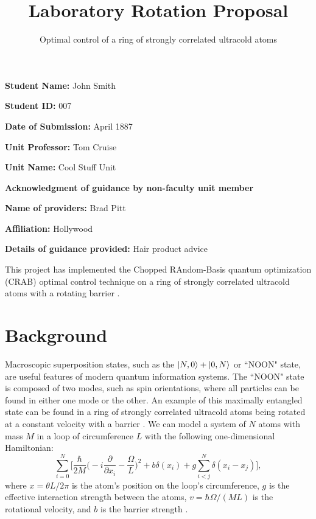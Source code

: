 \documentclass[paper=a4wide, fontsize=12pt]{scrartcl}	 %
\title{\vspace{-1.8cm}  \color{DarkRed} Laboratory Rotation Proposal}
\subtitle{Optimal control of a ring of strongly correlated ultracold atoms %
\vspace{-2cm} }
\date{} %
\begin{document}
\maketitle %
\thispagestyle{fancy} %


\vspace{-0.5cm} \textbf{Student Name:}  John Smith

\textbf{Student ID:} 007

\textbf{Date of Submission:} April 1887

 \textbf{Unit Professor:} Tom Cruise

\textbf{Unit Name:} Cool Stuff Unit

\vspace{3mm} \textbf{Acknowledgment of guidance by non-faculty unit member} 

\textbf{Name of providers:} Brad Pitt

\textbf{Affiliation:} Hollywood

\textbf{Details of guidance provided:}	 Hair product advice

\vspace{0.5cm}


This project has implemented the Chopped RAndom-Basis quantum optimization (CRAB) optimal control technique \cite{CRAB} on a ring of strongly correlated ultracold atoms with a rotating barrier \cite{RING}.


\section*{Background}
Macroscopic superposition states, such as the $\ket{N,0} + \ket{0,N}$ or ``NOON" state, are useful features of modern quantum information systems. The ``NOON" state is composed of two modes, such as spin orientations, where all particles can be found in either one mode or the other. An example of this maximally entangled state can be found in a ring of strongly correlated ultracold atoms being rotated at a constant velocity with a barrier \cite{RING}. We can model a system of $N$ atoms with mass $M$ in a loop of circumference $L$ with the following one-dimensional Hamiltonian\cite{RING}:
$$\sum_{i=0} ^{N} \bigg[{\frac{\hbar}{2M}\bigg(-i\frac{\partial}{\partial x_i}-\frac{\Omega}{L}}\bigg)^2 + b\delta(x_i) +g \sum_{i<j} ^{N} \delta (x_i - x_j )\bigg],$$
where $x = \theta L / 2 \pi$ is the atom's position on the loop's circumference, $g$ is the effective interaction strength between the atoms, $v = \hbar \Omega/(ML)$ is the rotational velocity, and $b$ is the barrier strength \cite{RING}. 
\end{document}
